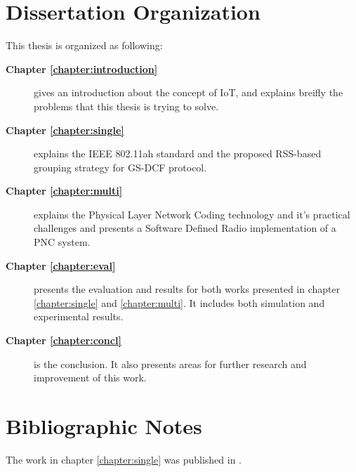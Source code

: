 \section{Dissertation Organization}

This thesis is organized as following:
\begin{description}
\item[\textbf{Chapter \ref{chapter:introduction}}] gives an introduction about the concept of IoT, and explains breifly the problems that this thesis is trying to solve.
\item[\textbf{Chapter \ref{chapter:single}}] explains the IEEE 802.11ah standard and the proposed RSS-based grouping strategy for GS-DCF protocol.
\item[\textbf{Chapter \ref{chapter:multi}}] explains the Physical Layer Network Coding technology and it's practical challenges and presents a Software Defined Radio implementation of a PNC system.
\item[\textbf{Chapter \ref{chapter:eval}}] presents the evaluation and results for both works presented in chapter \ref{chapter:single} and \ref{chapter:multi}. It includes both simulation and experimental results.
\item[\textbf{Chapter \ref{chapter:concl}}] is the conclusion. It also presents areas for further research and improvement of this work.
\end{description}


\section{Bibliographic Notes}
The work in chapter \ref{chapter:single} was published in \cite{ghasemiahmadi2017rss}. 